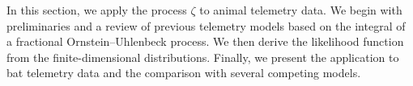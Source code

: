 \documentclass[preprint,12pt,authoryear]{elsarticle}
\begin{document}
In this section, we apply the  process $\zeta$ to animal telemetry data. We begin with preliminaries and a review of previous telemetry models based on the integral of a fractional Ornstein--Uhlenbeck process. We then derive the likelihood function from the finite-dimensional distributions. Finally, we present the application to bat telemetry data and the comparison with several competing models.



\end{document}
